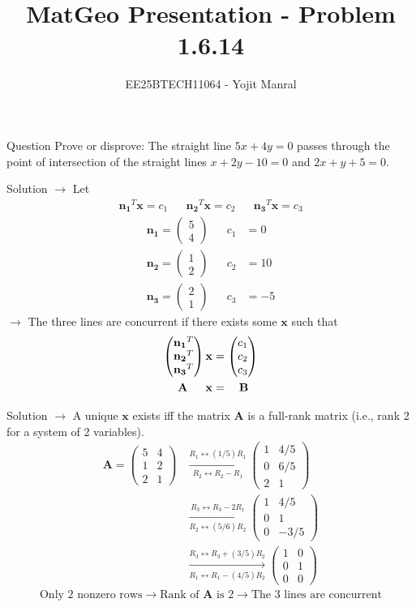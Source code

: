 \documentclass{beamer}
\title{MatGeo Presentation - Problem 1.6.14}
\author{EE25BTECH11064 - Yojit Manral}
\date{}
\numberwithin{equation}{section}
\theoremstyle{remark}
\newcommand{\myvec}[1]{\ensuremath{\begin{pmatrix}#1\end{pmatrix}}}
\let\vec\mathbf
\begin{document}
\frame{\titlepage}
\begin{frame}{Question}
Prove or disprove: The straight line $5x + 4y = 0$ passes through the point of intersection of the straight lines $x + 2y - 10 = 0$ and $2x + y + 5 = 0$.
\end{frame}

\begin{frame}{Solution}
$\rightarrow$ Let
\begin{align*}
    \vec{n_1}^T\vec{x} = c_1 && \vec{n_2}^T\vec{x} = c_2 && \vec{n_3}^T\vec{x} = c_3
\end{align*}
\begin{align}
    \vec{n_1} = \myvec{5\\4} && c_1 &= 0 \\
    \vec{n_2} = \myvec{1\\2} && c_2 &= 10 \\
    \vec{n_3} = \myvec{2\\1} && c_3 &= -5
\end{align}
$\rightarrow$ The three lines are concurrent if there exists some $\vec{x}$ such that
\begin{align}
    \myvec{\vec{n_1}^T\\\vec{n_2}^T\\\vec{n_3}^T} \vec{x} &= \myvec{c_1\\c_2\\c_3} \\
    \vec{A}\hspace{0.55cm}\vec{x} &= \hspace{0.35cm}\vec{B}
\end{align}
\end{frame}

\begin{frame}{Solution}
$\rightarrow$ A unique $\vec{x}$ exists iff the matrix $\vec{A}$ is a full-rank matrix (i.e., rank 2 for a system of 2 variables).
\begin{align}
    \vec{A} = \myvec{5&4\\1&2\\2&1}
    &\xrightarrow[R_2 \leftrightarrow R_2 - R_1]{R_1 \leftrightarrow (1/5)R_1} \myvec{1&4/5\\0&6/5\\2&1}\\
    &\xrightarrow[R_2 \leftrightarrow (5/6)R_2]{R_3 \leftrightarrow R_3 - 2R_1} \myvec{1&4/5\\0&1\\0&-3/5}\\
    &\xrightarrow[R_1 \leftrightarrow R_1 - (4/5)R_2]{R_3 \leftrightarrow R_3 + (3/5)R_2} \myvec{1&0\\0&1\\0&0}
\end{align}
\begin{align*}
    \text{Only 2 nonzero rows}
    \longrightarrow \text{Rank of $\vec{A}$ is 2}
    \longrightarrow \text{The 3 lines are concurrent}
\end{align*}
\end{frame}
\end{document}
